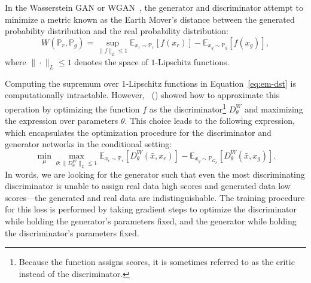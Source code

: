 \documentclass[letterpaper]{article} %
\newcommand{\namecite}[1]{\citeauthor{#1}~(\citeyear{#1})}
\begin{document}
In the Wasserstein GAN or WGAN~\cite{arjovsky2017wasserstein}, the generator and discriminator attempt to minimize a metric known as the Earth Mover's distance between the generated probability distribution and the real probability distribution:
\begin{equation}\label{eq:em-dst}
W(\mathbb{P}_r, \mathbb{P}_g) = \sup_{\|f\|_L \leq 1} \mathbb{E}_{x_r\sim \mathbb{P}_r}\left[ f(x_r) \right] - \mathbb{E}_{x_g\sim \mathbb{P}_g}\left[ f(x_g) \right],
\end{equation}
where $\| \cdot \|_L \leq 1$ denotes the space of $1$-Lipschitz functions.

Computing the supremum over $1$-Lipschitz functions in Equation~\eqref{eq:em-dst} is computationally intractable. However, \namecite{arjovsky2017wasserstein} showed how to approximate this operation by optimizing the function $f$ as the discriminator\footnote{Because the function assigns scores, it is sometimes referred to as the critic instead of the discriminator.} $D^W_\theta$ and maximizing the expression over parameters $\theta$. This choice leads to the following expression, which encapsulates the optimization procedure for the discriminator and generator networks in the conditional setting:
\begin{equation}
\min_{\mu} \max_{\theta : \|D^W_\theta\|_L \leq 1} \mathbb{E}_{x_r \sim \mathbb{P}_r} \left[ D^W_{\theta}(\bar{x}, x_r)\right] - \mathbb{E}_{x_g \sim \mathbb{P}_{G_\mu}} \left[ D^W_{\theta}(\bar{x}, x_g) \right].
\end{equation}
In words, we are looking for the generator such that even the most discriminating discriminator is unable to assign real data high scores and generated data low scores---the generated and real data are indistinguishable. The training procedure for this loss is performed by taking gradient steps to optimize the discriminator while holding the generator's parameters fixed, and the generator while holding the discriminator's parameters fixed.
\end{document}
